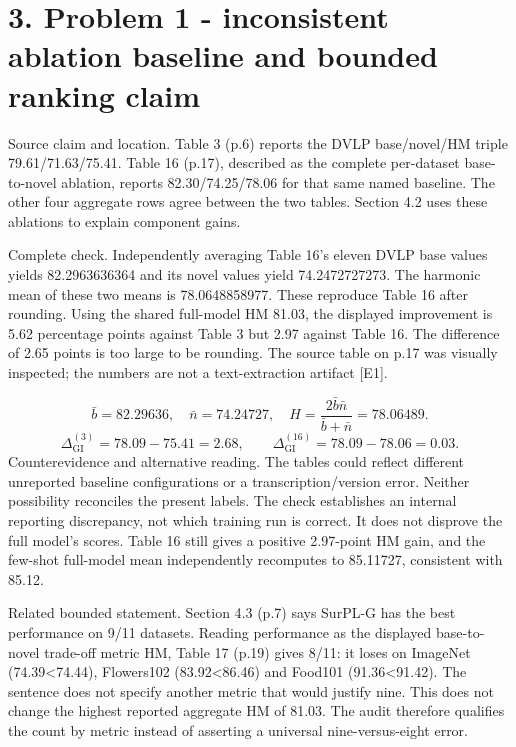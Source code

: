\documentclass[10pt]{article}
\begin{document}
\section*{3. Problem 1 - inconsistent ablation baseline and bounded ranking claim}
Source claim and location. Table 3 (p.6) reports the DVLP base/novel/HM triple 79.61/71.63/75.41. Table 16 (p.17), described as the complete per-dataset base-to-novel ablation, reports 82.30/74.25/78.06 for that same named baseline. The other four aggregate rows agree between the two tables. Section 4.2 uses these ablations to explain component gains.\par
Complete check. Independently averaging Table 16’s eleven DVLP base values yields 82.2963636364 and its novel values yield 74.2472727273. The harmonic mean of these two means is 78.0648858977. These reproduce Table 16 after rounding. Using the shared full-model HM 81.03, the displayed improvement is 5.62 percentage points against Table 3 but 2.97 against Table 16. The difference of 2.65 points is too large to be rounding. The source table on p.17 was visually inspected; the numbers are not a text-extraction artifact [E1].\par
\[\bar b=82.29636,\quad\bar n=74.24727,\quad H=\frac{2\bar b\bar n}{\bar b+\bar n}=78.06489.\] \[\Delta_{\mathrm{GI}}^{(3)}=78.09-75.41=2.68,\qquad \Delta_{\mathrm{GI}}^{(16)}=78.09-78.06=0.03.\] Counterevidence and alternative reading. The tables could reflect different unreported baseline configurations or a transcription/version error. Neither possibility reconciles the present labels. The check establishes an internal reporting discrepancy, not which training run is correct. It does not disprove the full model’s scores. Table 16 still gives a positive 2.97-point HM gain, and the few-shot full-model mean independently recomputes to 85.11727, consistent with 85.12.\par
Related bounded statement. Section 4.3 (p.7) says SurPL-G has the best performance on 9/11 datasets. Reading performance as the displayed base-to-novel trade-off metric HM, Table 17 (p.19) gives 8/11: it loses on ImageNet (74.39<74.44), Flowers102 (83.92<86.46) and Food101 (91.36<91.42). The sentence does not specify another metric that would justify nine. This does not change the highest reported aggregate HM of 81.03. The audit therefore qualifies the count by metric instead of asserting a universal nine-versus-eight error.\par
\end{document}
